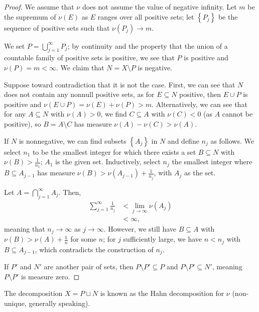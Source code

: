 \documentclass[10pt]{extarticle}
\newcommand{\set}[1]{\left\{#1\right\}}
\theoremstyle{plain}
\theoremstyle{definition}
\theoremstyle{note}
\renewcommand{\newline}{\hfill\break}
\begin{document}
\begin{proof}
  We assume that $\nu$ does not assume the value of negative infinity. Let $m$ be the supremum of $\nu(E)$ as $E$ ranges over all positive sets; let $\set{P_j}$ be the sequence of positive sets such that $\nu(P_j) \rightarrow m$.\newline

  We set $P = \bigcup_{j=1}^{\infty}P_j$; by continuity and the property that the union of a countable family of positive sets is positive, we see that $P$ is positive and $\nu(P) = m < \infty$. We claim that $N = X\setminus P$ is negative.\newline

  Suppose toward contradiction that it is not the case. First, we can see that $N$ does not contain any nonnull positive sets, as for $E\subseteq N$ positive, then $E\cup P$ is positive and $\nu(E\cup P) = \nu(E) + \nu(P) > m$. Alternatively, we can see that for any $A\subseteq N$ with $\nu(A) > 0$, we find $C\subseteq A$ with $\nu(C) < 0$ (as $A$ cannot be positive), so $B = A\setminus C$ has measure $\nu(A) - \nu(C) > \nu(A)$.\newline

  If $N$ is nonnegative, we can find subsets $\set{A_j}$ in $N$ and define $n_j$ as follows. We select $n_1$ to be the smallest integer for which there exists a set $B\subseteq N$ with $\nu(B) > \frac{1}{n_1}$; $A_1$ is the given set. Inductively, select $n_j$ the smallest integer where $B\subseteq A_{j-1}$ has measure $\nu(B) > \nu(A_{j-1}) + \frac{1}{n_j}$, with $A_j$ as the set.\newline

  Let $A = \bigcap_{j=1}^{\infty}A_j$. Then,
  \begin{align*}
    \sum_{j=1}^{\infty}\frac{1}{n_j} &< \lim_{j\rightarrow\infty}\nu\left(A_j\right)\\
                                     &<\infty,
  \end{align*}
  meaning that $n_j \rightarrow\infty$ as $j\rightarrow\infty$. However, we still have $B\subseteq A$ with $\nu(B) > \nu(A) + \frac{1}{n}$ for some $n$; for $j$ sufficiently large, we have $n < n_j$ with $B\subseteq A_{j-1}$, which contradicts the construction of $n_j$.\newline

  If $P'$ and $N'$ are another pair of sets, then $P\setminus P' \subseteq P$ and $P\setminus P' \subseteq N'$, meaning $P\setminus P'$ is measure zero.
\end{proof}
The decomposition $X = P\sqcup N$ is known as the Hahn decomposition for $\nu$ (non-unique, generally speaking).\newline
\end{document}
